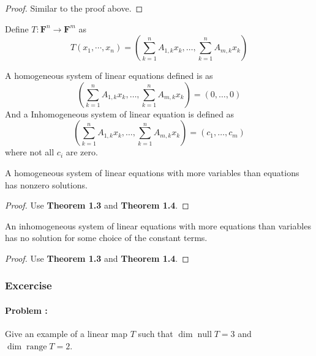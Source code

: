 \begin{proof}
    Similar to the proof above.
\end{proof}

\begin{definition}
    Define $T: \mathbf{F}^n \to \mathbf{F}^m$ as 
    \[ T(x_1,\cdots,x_n)=\left( \sum_{k=1}^{n} A_{1,k} x_k , \ldots, \sum_{k=1}^{n} A_{m,k} x_k \right)\]
\end{definition}


\begin{definition}
    A homogeneous system of linear equations defined is as 
    \[ \left( \sum_{k=1}^{n} A_{1,k} x_k , \ldots, \sum_{k=1}^{n} A_{m,k} x_k \right) = (0, \ldots, 0) \]
    And a Inhomogeneous system of linear equation is defined as 
    \[ \left( \sum_{k=1}^{n} A_{1,k} x_k , \ldots, \sum_{k=1}^{n} A_{m,k} x_k \right) = (c_1, \ldots, c_m) \]
    where not all $c_i$ are zero.
\end{definition}

\begin{proposition}
    A homogeneous system of linear equations with more variables than equations
    has nonzero solutions.
\end{proposition}

\begin{proof}
    Use \textbf{Theorem 1.3} and \textbf{Theorem 1.4}.
\end{proof}

\begin{proposition}
    An inhomogeneous system of linear equations with more equations than
    variables has no solution for some choice of the constant terms.
\end{proposition}

\begin{proof}
    Use \textbf{Theorem 1.3} and \textbf{Theorem 1.4}.
\end{proof}

\subsubsection{Excercise}

\paragraph{Problem :} Give an example of a linear map $T$ such that $\dim \operatorname{null} T = 3$ and \newline
$\dim \operatorname{range} T = 2$.

